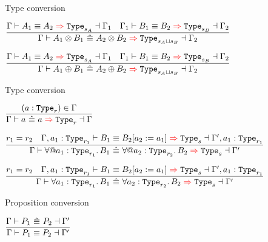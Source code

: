 \begin{frame}{Type conversion}

\begin{center}

  $\infrule{\infertypeconv{\Gamma}{A_1}{A_2}[s_A]{\Gamma_1} \quad \infertypeconv{\Gamma_1}{B_1}{B_2}[s_B]{\Gamma_2}}{\infertypeconvwhnf{\Gamma}{\Prod{A_1}{B_1}}{\Prod{A_2}{B_2}}[\lubqty{s_A}{s_B}]{\Gamma_2}}$

  \vspace{2em}

  $\infrule{\infertypeconv{\Gamma}{A_1}{A_2}[s_A]{\Gamma_1} \quad \infertypeconv{\Gamma_1}{B_1}{B_2}[s_B]{\Gamma_2}}{\infertypeconvwhnf{\Gamma}{\Sum{A_1}{B_1}}{\Sum{A_2}{B_2}}[\lubqty{s_A}{s_B}]{\Gamma_2}}$
\end{center}

\end{frame}

\begin{frame}{Type conversion}

\begin{center}
  $\infrule{(a : \Type[r]) \in \Gamma}{\infertypeconvwhnf{\Gamma}{a}{a}[r]{\Gamma}}$

  \vspace{2em}

  $\infrule{r_1 = r_2 \quad \infertypeconv{\extendtype{\Gamma}{a_1}[r_1]}{B_1}{\subst{B_2}{a_2}{a_1}}[s]{\extendtype{\Gamma'}{a_1}[r_1]}}{\infertypeconvwhnf{\Gamma}{\ForallE{a_1}[r_1]{B_1}}{\ForallE{a_2}[r_2]{B_2}}[s]{\Gamma'}}$

  \vspace{2em}

  $\infrule{r_1 = r_2 \quad \infertypeconv{\extendtype{\Gamma}{a_1}[r_1]}{B_1}{\subst{B_2}{a_2}{a_1}}[s]{\extendtype{\Gamma'}{a_1}[r_1]}}{\infertypeconvwhnf{\Gamma}{\ForallI{a_1}[r_1]{B_1}}{\ForallI{a_2}[r_2]{B_2}}[s]{\Gamma'}}$
\end{center}

\end{frame}

\begin{frame}{Proposition conversion}

\begin{center}
  $\infrule{\checkpropconvwhnf{\Gamma}{P_1}{P_2}{\Gamma'}}{\checkpropconv{\Gamma}{P_1}{P_2}{\Gamma'}}$
\end{center}

\end{frame}

